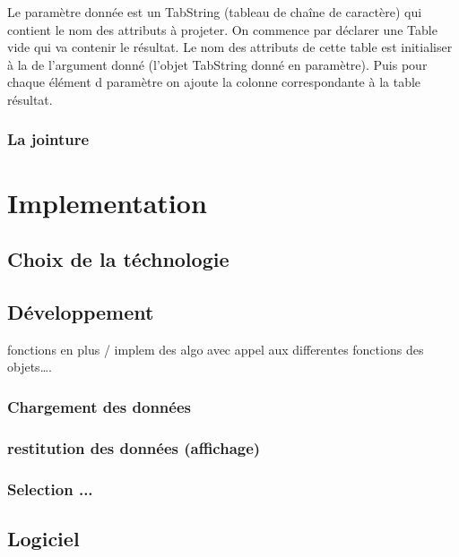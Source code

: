 \documentclass[oneside,13pt,a4paper]{report}
\begin{document}
	            Le paramètre donnée est un TabString (tableau de chaîne de caractère) qui contient le nom des attributs à projeter.
                On commence par déclarer une Table vide qui va contenir le résultat.
                Le nom des attributs de cette table est initialiser à la de l'argument donné (l'objet TabString donné en paramètre).
                Puis pour chaque élément d paramètre on ajoute la colonne correspondante à la table résultat.

            \subsection{La jointure}


    \chapter{Implementation}

        \section{Choix de la téchnologie}

        \section{Développement}

            fonctions en plus / implem des algo avec appel aux differentes fonctions des objets….

            \subsection{Chargement des données}

            \subsection{restitution des données (affichage)}

            \subsection{Selection ...}

        \section{Logiciel}
\end{document}
